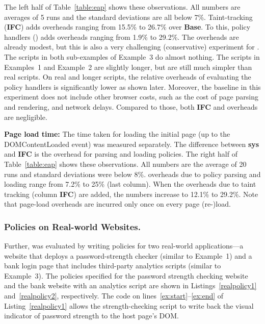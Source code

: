 The left half of Table~\ref{table:eap} shows these observations.
%
All numbers are averages of 5 runs and the standard deviations are
all below 7\%. %
%
Taint-tracking (\textbf{IFC}) adds overheads ranging from 15.5\% to
26.7\% over \textbf{Base}. To this, policy handlers (\textbf{\sys})
adds overheads ranging from 1.9\% to 29.2\%. The \textbf{\sys}
overheads are already modest, but this is also a very challenging
(conservative) experiment for {\sys}. The scripts in 
both sub-examples of Example~3 do almost nothing. The scripts in
Examples~1 and Example~2 are slightly longer, but are still much
simpler than real scripts. On real and longer scripts, the relative
overheads of evaluating the policy handlers is significantly lower as
shown later. Moreover, the baseline in this experiment does not
include other browser costs, such as the cost of page parsing and
rendering, and network delays. Compared to those, both \textbf{IFC}
and \textbf{\sys} overheads are negligible.

\noindent
\textbf{Page load time:} The time taken for loading the initial page
(up to the DOMContentLoaded event) was measured separately. The
difference between \textbf{sys} and \textbf{IFC} is the overhead for
parsing and loading policies. The right half of Table~\ref{table:eap}
shows these observations. All numbers are the average of 20 runs and
standard deviations were below 8\%.
{\sys} overheads due to policy parsing and loading range from 7.2\% to
25\% (last column). When the overheads due to taint tracking
(column \textbf{IFC}) are added, the numbers increase to 12.1\% to
29.2\%. Note that page-load overheads are incurred only once on every
page (re-)load. 

\subsubsection{Policies on Real-world Websites.}
\label{sec:realpolicies}

Further, {\sys} was evaluated by writing policies for two real-world
applications---a website that deploys a password-strength checker
(similar to Example~1) and a bank login page that includes third-party
analytics scripts (similar to Example~3).
The {\sys} policies specified for the password strength checking
website and the bank website with an analytics script are shown in
Listings~\ref{realpolicy1} and~\ref{realpolicy2}, respectively. The
code on lines~\ref{ex:start}--\ref{ex:end} of
Listing~\ref{realpolicy1} allows the strength-checking script to write
back the visual indicator of password strength to the host page's DOM.

